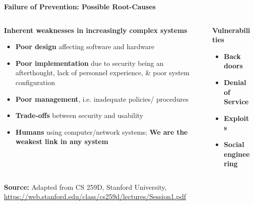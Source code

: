 \documentclass[aspectratio=169]{beamer} %
\begin{document}
\begin{frame}{\textbf{Failure of Prevention: Possible Root-Causes}}
		\begin{columns}
			\begin{column}{0.6\textwidth}
				\begin{block}{\textbf{Inherent weaknesses in increasingly complex systems}}
					\begin{itemize}
						\item \textbf{Poor design} affecting software and hardware
						\item \textbf{Poor implementation} due to security being an afterthought, lack of personnel experience, \& poor system configuration
						\item \textbf{Poor management}, i.e. inadequate policies/ procedures
						\item \textbf{Trade-offs} between security and usability
						\item \textbf{Humans} using computer/network systems; \textcolor{miamired}{\textbf{We are the weakest link in any system}}  
					\end{itemize}
				\end{block}
			\end{column}
			\begin{column}{0.35\textwidth}
				\begin{block}{\textbf{Vulnerabilities}}
					\begin{itemize}
						\item \textbf{Back doors}
						\item \textbf{Denial of Service}
						\item \textbf{Exploits}
						\item \textbf{Social engineering}
					\end{itemize}
				\end{block}
			\end{column}
		\end{columns}

	\EndofPage
	
	\centering \scriptsize{\textbf{Source:} Adapted from CS 259D, Stanford University, \url{https://web.stanford.edu/class/cs259d/lectures/Session1.pdf}}
	
	\vspace{0.5\baselineskip}

\end{frame}
\end{document}
